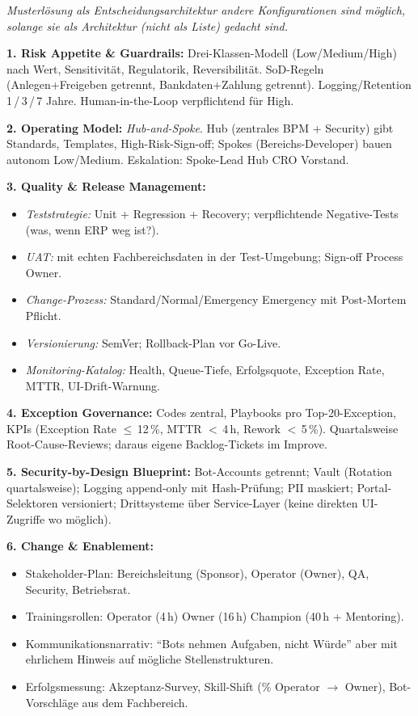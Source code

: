 \documentclass[11pt,a4paper,oneside]{article}
\begin{document}
\begin{loesungbox}
\emph{Musterl\"osung als Entscheidungsarchitektur \textendash{} andere Konfigurationen sind m\"oglich, solange sie als Architektur (nicht als Liste) gedacht sind.}

\smallskip
\textbf{1. Risk Appetite \& Guardrails:} Drei-Klassen-Modell (Low/Medium/High) nach Wert, Sensitivit\"at, Regulatorik, Reversibilit\"at. SoD-Regeln (Anlegen+Freigeben getrennt, Bankdaten+Zahlung getrennt). Logging/Retention 1\,/\,3\,/\,7 Jahre. Human-in-the-Loop verpflichtend f\"ur High.

\smallskip
\textbf{2. Operating Model:} \emph{Hub-and-Spoke}. Hub (zentrales BPM + Security) gibt Standards, Templates, High-Risk-Sign-off; Spokes (Bereichs-Developer) bauen autonom Low/Medium. Eskalation: Spoke-Lead \textrightarrow{} Hub \textrightarrow{} CRO \textrightarrow{} Vorstand.

\smallskip
\textbf{3. Quality \& Release Management:}
\begin{itemize}
  \item \emph{Teststrategie:} Unit + Regression + Recovery; verpflichtende Negative-Tests (was, wenn ERP weg ist?).
  \item \emph{UAT:} mit echten Fachbereichsdaten in der Test-Umgebung; Sign-off Process Owner.
  \item \emph{Change-Prozess:} Standard/Normal/Emergency \textendash{} Emergency mit Post-Mortem Pflicht.
  \item \emph{Versionierung:} SemVer; Rollback-Plan vor Go-Live.
  \item \emph{Monitoring-Katalog:} Health, Queue-Tiefe, Erfolgsquote, Exception Rate, MTTR, UI-Drift-Warnung.
\end{itemize}

\smallskip
\textbf{4. Exception Governance:} Codes zentral, Playbooks pro Top-20-Exception, KPIs (Exception Rate $\leq$\,12\,\%, MTTR $<$\,4\,h, Rework $<$\,5\,\%). Quartalsweise Root-Cause-Reviews; daraus eigene Backlog-Tickets im Improve.

\smallskip
\textbf{5. Security-by-Design Blueprint:} Bot-Accounts getrennt; Vault (Rotation quartalsweise); Logging append-only mit Hash-Pr\"ufung; PII maskiert; Portal-Selektoren versioniert; Drittsysteme \"uber Service-Layer (keine direkten UI-Zugriffe wo m\"oglich).

\smallskip
\textbf{6. Change \& Enablement:}
\begin{itemize}
  \item Stakeholder-Plan: Bereichsleitung (Sponsor), Operator (Owner), QA, Security, Betriebsrat.
  \item Trainingsrollen: Operator (4\,h) \textrightarrow{} Owner (16\,h) \textrightarrow{} Champion (40\,h + Mentoring).
  \item Kommunikationsnarrativ: ``Bots nehmen Aufgaben, nicht W\"urde'' \textendash{} aber mit ehrlichem Hinweis auf m\"ogliche Stellenstrukturen.
  \item Erfolgsmessung: Akzeptanz-Survey, Skill-Shift (\% Operator $\rightarrow$ Owner), Bot-Vorschl\"age aus dem Fachbereich.
\end{itemize}


\end{loesungbox}
\end{document}
